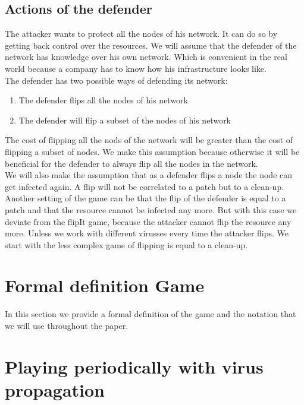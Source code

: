 \subsection{Actions of the defender}
The attacker wants to protect all the nodes of his network. It can do so by getting back control over the resources. We will assume that the defender of the network has knowledge over his own network. Which is convenient in the real world because a company has to know how his infrastructure looks like.\\

The defender has two possible ways of defending its network:
\begin{enumerate}
\item The defender flips all the nodes of his network
\item The defender will flip a subset of the nodes of his network
\end{enumerate}

The cost of flipping all the nods of the network will be greater than the cost of flipping a subset of nodes. We make this assumption because otherwise it will be beneficial for the defender to always flip all the nodes in the network.\\

We will also make the assumption that as a defender flips a node the node can get infected again. A flip will not be  correlated to a patch but to a clean-up. 
 Another setting of the game can be that the flip of the defender is equal to a patch and that the resource cannot be infected any more. But with this case we deviate from the flipIt game, because the attacker cannot flip the resource any more. Unless we work with different virusses every time the attacker flips. We start with the less complex game of flipping is equal to a clean-up.


\section{Formal definition Game}

In this section we provide a formal definition of the game and the notation that we will use throughout the paper. 


\section*{Playing periodically with virus propagation}

